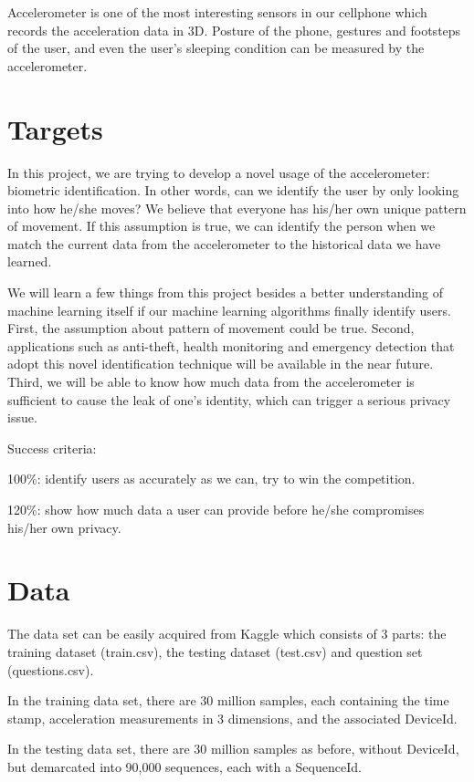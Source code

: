\documentclass[12pt]{article}
\begin{document}
Accelerometer is one of the most interesting sensors in our cellphone which records the acceleration data in 3D. Posture of the phone, gestures and footsteps of the user, and even the user's sleeping condition can be measured by the accelerometer. 


\section{Targets}

In this project, we are trying to develop a novel usage of the accelerometer: biometric identification. In other words, can we identify the user by only looking into how he/she moves? We believe that everyone has his/her own unique pattern of movement. If this assumption is true, we can identify the person when we match the current data from the accelerometer to the historical data we have learned. 

We will learn a few things from this project besides a better understanding of machine learning itself if our machine learning algorithms finally identify users. First, the assumption about pattern of movement could be true. Second, applications such as anti-theft, health monitoring and emergency detection that adopt this novel identification technique will be available in the near future. Third, we will be able to know how much data from the accelerometer is sufficient to cause the leak of one's identity, which can trigger a serious privacy issue. 

Success criteria:

100\%: identify users as accurately as we can, try to win the competition.

120\%: show how much data a user can provide before he/she compromises his/her own privacy. 

\section{Data}
The data set can be easily acquired from Kaggle which consists of 3 parts: the training dataset (train.csv), the testing dataset (test.csv) and question set (questions.csv).

In the training data set, there are 30 million samples, each containing the time stamp, acceleration measurements in 3 dimensions, and the associated DeviceId.

In the testing data set, there are 30 million samples as before, without  DeviceId, but demarcated into 90,000 sequences, each with a SequenceId.
\end{document}

